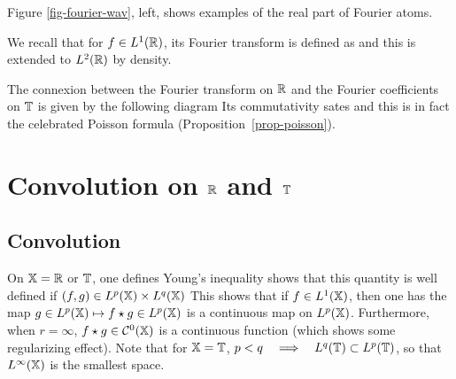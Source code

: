 Figure \ref{fig-fourier-wav}, left, shows examples of the real part of Fourier atoms.



We recall that for $f \in L^1(\mathbb{R})$, its Fourier transform is defined as
and this is extended to $L^2(\mathbb{R})$ by density. 

The connexion between the Fourier transform on $\mathbb{R}$ and the Fourier coefficients on $\mathbb{T}$ is given by the following diagram 
Its commutativity sates
and this is in fact the celebrated Poisson formula (Proposition~\ref{prop-poisson}). 






\section{Convolution on $\mathbb{R}$ and $\mathbb{T}$}

\subsection{Convolution}

On $\mathbb{X}=\mathbb{R}$ or $\mathbb{T}$, one defines 
Young's inequality shows that this quantity is well defined if $(f,g) \in L^p(\mathbb{X}) \times L^q(\mathbb{X})$
This shows that if $f \in L^1(\mathbb{X})$, then one has the map $g \in L^p(\mathbb{X}) \mapsto f \star g \in L^p(\mathbb{X})$ is a continuous map on $L^p(\mathbb{X})$. Furthermore, when $r=\infty$, $f \star g \in \mathcal{C}^0(\mathbb{X})$ is a continuous function (which shows some regularizing effect).
%
Note that for $\mathbb{X}=\mathbb{T}$, $p<q \quad\Longrightarrow\quad L^q(\mathbb{T}) \subset L^p(\mathbb{T})$, so that $L^\infty(\mathbb{X})$ is the smallest space. 



